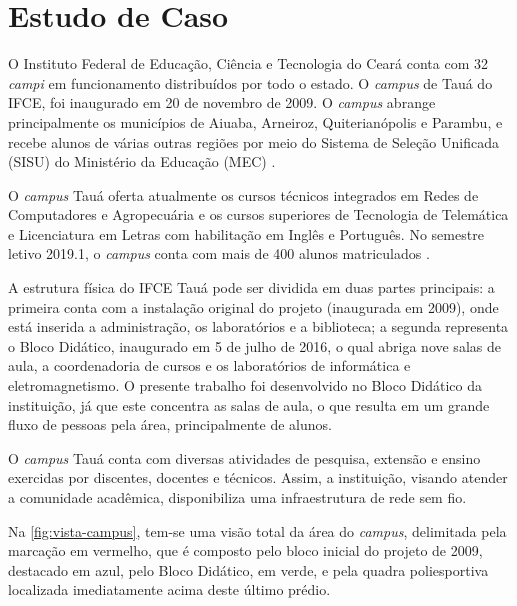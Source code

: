 \section{Estudo de Caso}
\label{sec:estudo-de-caso}

O Instituto Federal de Educação, Ciência e Tecnologia do Ceará conta com 32 \textit{campi} em funcionamento distribuídos por todo o estado. O \textit{campus} de Tauá do IFCE, foi inaugurado em 20 de novembro de 2009. O \textit{campus} abrange principalmente os municípios de Aiuaba, Arneiroz, Quiterianópolis e Parambu, e recebe alunos de várias outras regiões por meio do Sistema de Seleção Unificada (SISU) do Ministério da Educação (MEC) \cite{ifceTaua2019}.

O \textit{campus} Tauá oferta atualmente os cursos técnicos integrados em Redes de Computadores e Agropecuária e os cursos superiores de Tecnologia de Telemática e Licenciatura em Letras com habilitação em Inglês e Português. No semestre letivo 2019.1, o \textit{campus} conta com mais de 400 alunos matriculados \cite{ifceTaua2019}.

A estrutura física do IFCE Tauá pode ser dividida em duas partes principais: a primeira conta com a instalação original do projeto (inaugurada em 2009), onde está inserida a administração, os laboratórios e a biblioteca; a segunda representa o Bloco Didático, inaugurado em 5 de julho de 2016, o qual abriga nove salas de aula, a coordenadoria de cursos e os laboratórios de informática e eletromagnetismo. O presente trabalho foi desenvolvido no Bloco Didático da instituição, já que este concentra as salas de aula, o que resulta em um grande fluxo de pessoas pela área, principalmente de alunos.

O \textit{campus} Tauá conta com diversas atividades de pesquisa, extensão e ensino exercidas por discentes, docentes e técnicos. Assim, a instituição, visando atender a comunidade acadêmica, disponibiliza uma infraestrutura de rede sem fio.

Na \autoref{fig:vista-campus}, tem-se uma visão total da área do \textit{campus}, delimitada pela marcação em vermelho, que é composto pelo bloco inicial do projeto de 2009, destacado em azul, pelo Bloco Didático, em verde, e pela quadra poliesportiva localizada imediatamente acima deste último prédio.

